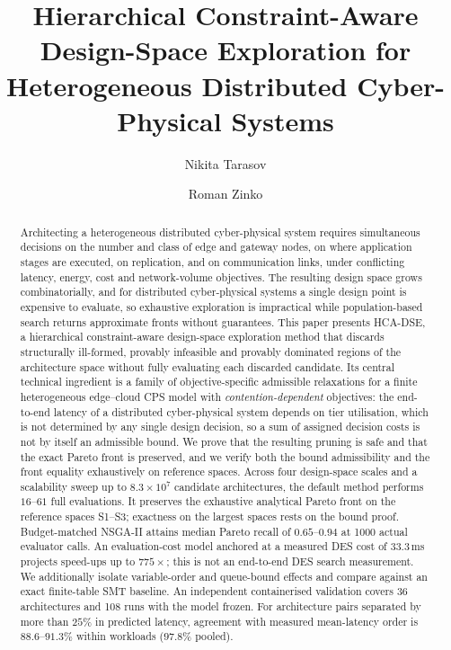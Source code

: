 \documentclass[preprint,11pt,3p]{elsarticle}
\theoremstyle{plain}
\theoremstyle{definition}
\newcommand{\EvalRange}{16\text{--}61}
\newcommand{\DesCostMs}{33.3}
\newcommand{\ProjectionMax}{775}
\newcommand{\BaselineRecallRange}{0.65\text{--}0.94}
\newcommand{\WithinAgreementRange}{88.6\text{--}91.3}
\newcommand{\PooledAgreement}{97.8}
\begin{document}
\begin{frontmatter}

\title{Hierarchical Constraint-Aware Design-Space Exploration for\\
Heterogeneous Distributed Cyber-Physical Systems}

\author[lp]{Nikita Tarasov}
\author[lp]{Roman Zinko}
\address[lp]{Lviv Polytechnic National University, Lviv, Ukraine}

\begin{abstract}
Architecting a heterogeneous distributed cyber-physical system requires simultaneous
decisions on the number and class of edge and gateway nodes, on where application
stages are executed, on replication, and on communication links, under conflicting
latency, energy, cost and network-volume objectives. The resulting design space grows
combinatorially, and for distributed cyber-physical systems a single design point is
expensive to evaluate, so exhaustive exploration is impractical while population-based
search returns approximate fronts without guarantees. This paper presents HCA-DSE, a
hierarchical constraint-aware design-space exploration method that discards structurally
ill-formed, provably infeasible and provably dominated regions of the architecture space
without fully evaluating each discarded candidate. Its central technical ingredient is a
family of objective-specific admissible relaxations for a finite heterogeneous edge--cloud CPS model with \emph{contention-dependent} objectives: the
end-to-end latency of a distributed cyber-physical system depends on tier utilisation,
which is not determined by any single design decision, so a sum of assigned decision costs is not by itself an admissible bound. We prove that the resulting
pruning is safe and that the exact Pareto front is preserved, and we verify both the
bound admissibility and the front equality exhaustively on reference spaces. Across four design-space scales and a scalability sweep up to $8.3\times10^{7}$
candidate architectures, the default method performs $\EvalRange$ full evaluations.
It preserves the exhaustive analytical Pareto front on the reference spaces S1--S3;
exactness on the largest spaces rests on the bound proof. Budget-matched NSGA-II attains
median Pareto recall of $\BaselineRecallRange$ at 1000 actual evaluator calls.
An evaluation-cost model anchored at a measured DES cost of $\DesCostMs$\,ms projects
speed-ups up to $\ProjectionMax\times$; this is not an end-to-end DES search measurement.
We additionally isolate variable-order and queue-bound effects and compare against an
exact finite-table SMT baseline. An independent containerised validation covers 36
architectures and 108 runs with the model frozen. For architecture pairs separated by
more than $25\%$ in predicted latency, agreement with measured mean-latency order is
$\WithinAgreementRange\%$ within workloads ($\PooledAgreement\%$ pooled).
\end{abstract}


\end{frontmatter}
\end{document}

